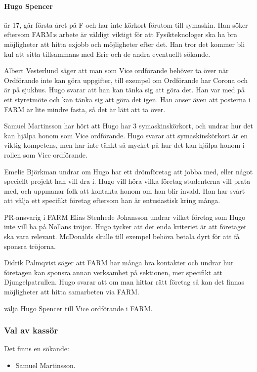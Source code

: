 \documentclass[hidelinks]{sektionsmote}
\begin{document}
\paragraph{Hugo Spencer} är 17, går första året på F och har inte körkort förutom till symaskin.
Han söker eftersom FARM:s arbete är väldigt viktigt för att Fysikteknologer ska ha bra möjligheter att hitta exjobb och möjligheter efter det.
Han tror det kommer bli kul att sitta tillsammans med Eric och de andra eventuellt sökande.\par
Albert Vesterlund säger att man som Vice ordförande behöver ta över när Ordförande inte kan göra uppgifter, till exempel om Ordförande har Corona och är på sjukhus.
Hugo svarar att han kan tänka sig att göra det.
Han var med på ett styretmöte och kan tänka sig att göra det igen.
Han anser även att posterna i FARM är lite mindre fasta, så det är lätt att ta över.\par
Samuel Martinsson har hört att Hugo har 3 symaskinskörkort, och undrar hur det kan hjälpa honom som Vice ordförande.
Hugo svarar att symaskinskörkort är en viktig kompetens, men har inte tänkt så mycket på hur det kan hjälpa honom i rollen som Vice ordförande.\par
Emelie Björkman undrar om Hugo har ett drömföretag att jobba med, eller något speciellt projekt han vill dra i.
Hugo vill höra vilka företag studenterna vill prata med, och uppmanar folk att kontakta honom om han blir invald.
Han har svårt att välja ett specifikt företag eftersom han är entusiastisk kring många.\par
PR-ansvarig i FARM Elias Stenhede Johansson undrar vilket företag som Hugo inte vill ha på Nollans tröjor.
Hugo tycker att det enda kriteriet är att företaget ska vara relevant.
McDonalds skulle till exempel behöva betala dyrt för att få sponsra tröjorna.\par
Didrik Palmqvist säger att FARM har många bra kontakter och undrar hur företagen kan sponsra annan verksamhet på sektionen, mer specifikt att Djungelpatrullen.
Hugo svarar att om man hittar rätt företag så kan det finnas möjligheter att hitta samarbeten via FARM.

\begin{beslut}
  \item välja Hugo Spencer till Vice ordförande i FARM.
\end{beslut}

\subsubsection{Val av kassör}
Det finns en sökande:
\begin{itemize}
    \item Samuel Martinsson.
\end{itemize}
\end{document}
